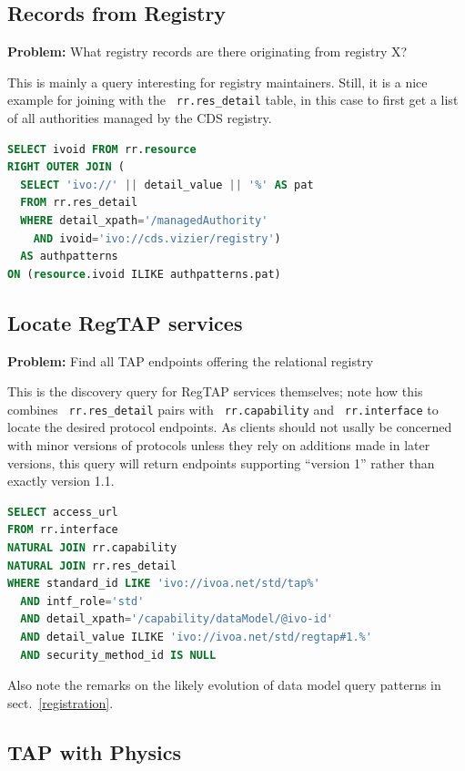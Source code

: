 \documentclass[11pt,a4paper]{ivoa}
\newcommand{\rtent}[1]{\texttt{\color{rtcolor} #1}}
\begin{document}
\subsection{Records from Registry}

\textbf{Problem:} What registry records are
there originating from registry X?

This is mainly a query interesting for registry maintainers.  Still,
it is a nice example for joining with the
\rtent{rr.res\_detail} table, in this case to
first get a list of all authorities managed by the CDS registry.


\begin{lstlisting}[language=SQL,flexiblecolumns=true]
SELECT ivoid FROM rr.resource
RIGHT OUTER JOIN (
  SELECT 'ivo://' || detail_value || '%' AS pat
  FROM rr.res_detail
  WHERE detail_xpath='/managedAuthority' 
    AND ivoid='ivo://cds.vizier/registry') 
  AS authpatterns
ON (resource.ivoid ILIKE authpatterns.pat)
\end{lstlisting}

\subsection{Locate RegTAP services}

\textbf{Problem:} Find all TAP endpoints offering the relational
registry

This is the discovery query for RegTAP services themselves;  note how
this combines 
\rtent{rr.res\_detail} pairs with
\rtent{rr.capability}
and 
\rtent{rr.interface} to locate the desired protocol
endpoints.  As clients should not usally be concerned with minor
versions of protocols unless  they rely on additions made in later
versions, this query will return endpoints supporting ``version 1'' rather
than exactly version 1.1.


\begin{lstlisting}[language=SQL,flexiblecolumns=true]
SELECT access_url
FROM rr.interface
NATURAL JOIN rr.capability
NATURAL JOIN rr.res_detail
WHERE standard_id LIKE 'ivo://ivoa.net/std/tap%'
  AND intf_role='std'
  AND detail_xpath='/capability/dataModel/@ivo-id'
  AND detail_value ILIKE 'ivo://ivoa.net/std/regtap#1.%'
  AND security_method_id IS NULL
\end{lstlisting}

Also note the remarks on the likely evolution of data model query
patterns in sect.~\ref{registration}.

\subsection{TAP with Physics}
\end{document}
